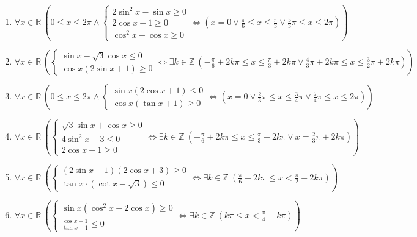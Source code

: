 \documentclass[11pt,a4paper]{article}
\begin{document}
\begin{enumerate}
\item $\displaystyle \forall x \in \mathbb{R}\ \left( 0 \le x \le 2\pi \land \begin{cases} 2\sin^{2} x - \sin x \ge 0 \\ 2\cos x - 1 \ge 0 \\ \cos^{2} x + \cos x \ge 0 \end{cases} \iff \left( x = 0 \lor \frac{\pi}{6} \le x \le \frac{\pi}{3} \lor \frac{5}{3}\pi \le x \le 2\pi \right) \right)$
\item $\displaystyle \forall x \in \mathbb{R}\ \left( \begin{cases} \sin x - \sqrt{3}\cos x \le 0 \\ \cos x(2\sin x + 1) \ge 0 \end{cases} \iff \exists k \in \mathbb{Z}\ \left( -\frac{\pi}{6} + 2k\pi \le x \le \frac{\pi}{3} + 2k\pi \lor \frac{4}{3}\pi + 2k\pi \le x \le \frac{3}{2}\pi + 2k\pi \right) \right)$
\item $\displaystyle \forall x \in \mathbb{R}\ \left( 0 \le x \le 2\pi \land \begin{cases} \sin x(2\cos x + 1) \le 0 \\ \cos x(\tan x + 1) \ge 0 \end{cases} \iff \left( x = 0 \lor \frac{2}{3}\pi \le x \le \frac{3}{4}\pi \lor \frac{7}{4}\pi \le x \le 2\pi \right) \right)$
\item $\displaystyle \forall x \in \mathbb{R}\ \left( \begin{cases} \sqrt{3}\sin x + \cos x \ge 0 \\ 4\sin^{2} x - 3 \le 0 \\ 2\cos x + 1 \ge 0 \end{cases} \iff \exists k \in \mathbb{Z}\ \left( -\frac{\pi}{6} + 2k\pi \le x \le \frac{\pi}{3} + 2k\pi \lor x = \frac{2}{3}\pi + 2k\pi \right) \right)$
\item $\displaystyle \forall x \in \mathbb{R}\ \left( \begin{cases} (2\sin x - 1)(2\cos x + 3) \ge 0 \\ \tan x \cdot (\cot x - \sqrt{3}) \le 0 \end{cases} \iff \exists k \in \mathbb{Z}\ \left( \frac{\pi}{6} + 2k\pi \le x < \frac{\pi}{2} + 2k\pi \right) \right)$
\item $\displaystyle \forall x \in \mathbb{R}\ \left( \begin{cases} \sin x(\cos^{2} x + 2\cos x) \ge 0 \\ \frac{\cos x + 1}{\tan x - 1} \le 0 \end{cases} \iff \exists k \in \mathbb{Z}\ \left( k\pi \le x < \frac{\pi}{4} + k\pi \right) \right)$

\end{enumerate}
\end{document}
